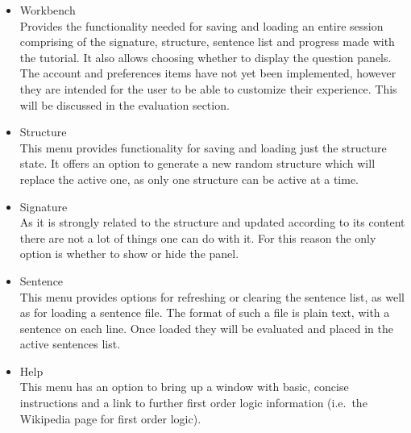 \documentclass{report}
\begin{document}
\begin{itemize}
\item Workbench \\
Provides the functionality needed for saving and loading an entire session 
comprising of the signature, structure, sentence list and progress made with the 
tutorial. It also allows choosing whether to display the question panels.\\
The account and preferences items have not yet been implemented, however they 
are intended for the user to be able to customize their experience. This will 
be discussed in the evaluation section.

\item Structure \\
This menu provides functionality for saving and loading just the structure 
state. It offers an option to generate a new random structure which will replace 
the active one, as only one structure can be active at a time.
\item Signature \\
As it is strongly related to the structure and updated according to its content 
there are not a lot of things one can do with it. For this reason the only 
option is whether to show or hide the panel.
\item Sentence \\
This menu provides options for refreshing or clearing the sentence list, as well 
as for loading a sentence file. The format of such a file is plain text, with a 
sentence on each line. Once loaded they will be evaluated and placed in the 
active sentences list.
\item Help \\
This menu has an option to bring up a window with basic, concise instructions 
and a link to further first order logic information (i.e.\ the Wikipedia page 
for first order logic).
\end{itemize}
\end{document}
